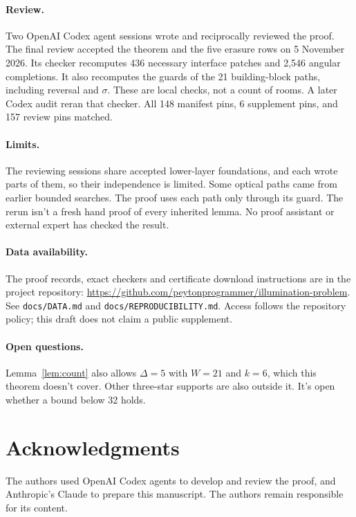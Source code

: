 \documentclass[11pt]{article}
\theoremstyle{remark}
\begin{document}
\paragraph{Review.} Two OpenAI Codex agent sessions wrote and reciprocally reviewed the proof. The final review accepted the theorem and the five erasure rows on 5 November 2026. Its checker recomputes 436 necessary interface patches and 2{,}546 angular completions. It also recomputes the guards of the 21 building-block paths, including reversal and $\sigma$. These are local checks, not a count of rooms. A later Codex audit reran that checker. All 148 manifest pins, 6 supplement pins, and 157 review pins matched.

\paragraph{Limits.} The reviewing sessions share accepted lower-layer foundations, and each wrote parts of them, so their independence is limited. Some optical paths came from earlier bounded searches. The proof uses each path only through its guard. The rerun isn't a fresh hand proof of every inherited lemma. No proof assistant or external expert has checked the result.

\paragraph{Data availability.} The proof records, exact checkers and certificate download instructions are in the project repository: \url{https://github.com/peytonprogrammer/illumination-problem}. See \texttt{docs/DATA.md} and \texttt{docs/REPRODUCIBILITY.md}. Access follows the repository policy; this draft does not claim a public supplement.

\paragraph{Open questions.} Lemma~\ref{lem:count} also allows $\Delta=5$ with $W=21$ and $k=6$, which this theorem doesn't cover. Other three-star supports are also outside it. It's open whether a bound below 32 holds.

\section*{Acknowledgments}
The authors used OpenAI Codex agents to develop and review the proof, and Anthropic's Claude to prepare this manuscript. The authors remain responsible for its content.
\end{document}
